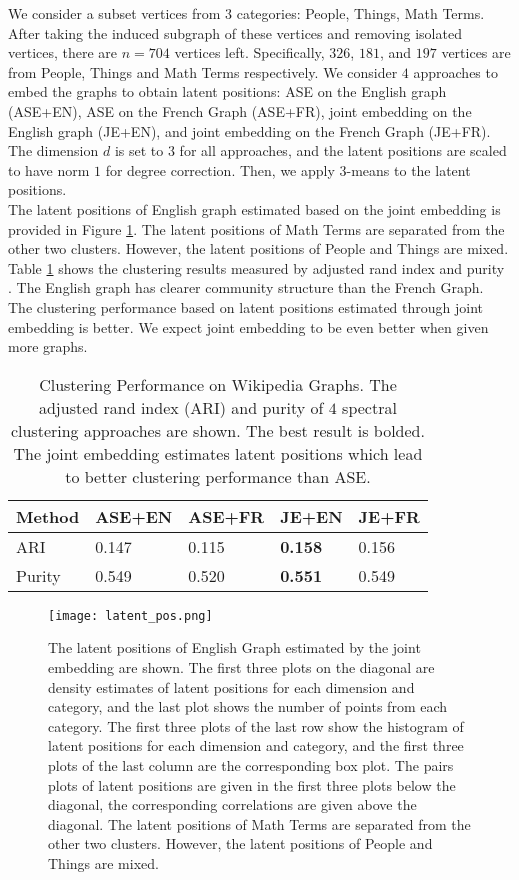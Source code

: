 \documentclass[10pt,journal,compsoc]{IEEEtran}
\begin{document}
\noindent We consider a subset vertices  from $3$ categories: People, Things, Math Terms. After taking the induced subgraph of these vertices and removing isolated vertices, there are $n=704$ vertices left. Specifically, $326$, $181$, and $197$ vertices are from People, Things and Math Terms respectively. We consider $4$ approaches to embed the graphs to obtain latent positions: ASE on the English graph (ASE+EN), ASE on the French Graph (ASE+FR), joint embedding on the English graph (JE+EN), and joint embedding on the French Graph (JE+FR). The dimension $d$ is set to $3$ for all approaches, and the latent positions are scaled to have norm $1$ for degree correction. Then, we apply $3$-means to the latent positions. \\ 

\noindent The latent positions of English graph estimated based on the joint embedding is provided in Figure \ref{fig:lp}. The latent positions of Math Terms are separated from the other two clusters. However, the latent positions of People and Things are mixed. Table  \ref{tb:wiki} shows the clustering results measured by adjusted rand index and purity \cite{steinley2004properties,rendon2011internal}. The English graph has clearer community structure than the French Graph. The clustering performance based on latent positions estimated through joint embedding is better. We expect joint embedding to be even better when given more graphs.
\begin{table}[H]
\centering
\begin{tabular}{|l|l|l|l|l|}
	\hline
Method& ASE+EN  & ASE+FR  & JE+EN & JE+FR \\\hline
ARI& 0.147 & 0.115  &{\bf 0.158} & 0.156   \\\hline
Purity& 0.549 & 0.520 &{\bf 0.551} & 0.549 \\
\hline
\end{tabular}
\caption{Clustering Performance on Wikipedia Graphs. The adjusted rand index (ARI) and purity of $4$ spectral clustering approaches are shown. The best result is bolded. The joint embedding estimates latent positions which lead to better clustering performance than ASE.}
\label{tb:wiki}
\end{table}

\begin{figure}[!htbp]
	\centering
	\texttt{[image: latent\_pos.png]}
	\caption{The latent positions of English Graph estimated by the joint embedding are shown. The first three plots on the diagonal are density estimates of latent positions for each dimension and category, and the last plot shows the number of points from each category. The first three plots of the last row show the histogram of latent positions for each dimension and category, and the first three plots of the last column are the corresponding box plot. The pairs plots of latent positions are given in the first three plots below the diagonal, the corresponding correlations are given above the diagonal. The latent positions of Math Terms are separated from the other two clusters. However, the latent positions of People and Things are mixed. }
	\label{fig:lp}
\end{figure}
\end{document}

